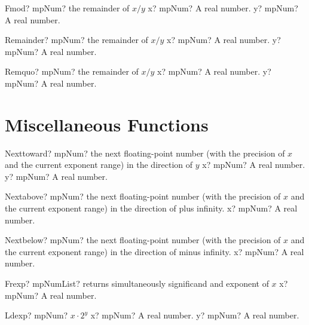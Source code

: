 \documentclass[12pt,a4paper,openany]{book}
\begin{document}
\begin{mpFunctionsExtract}
\mpFunctionTwo
{Fmod? mpNum? the remainder of $x/y$}
{x? mpNum? A real number.}
{y? mpNum? A real number.}
\end{mpFunctionsExtract}

\begin{mpFunctionsExtract}
\mpFunctionTwo
{Remainder? mpNum? the remainder of $x/y$}
{x? mpNum? A real number.}
{y? mpNum? A real number.}
\end{mpFunctionsExtract}

\begin{mpFunctionsExtract}
\mpFunctionTwo
{Remquo? mpNum? the remainder of $x/y$}
{x? mpNum? A real number.}
{y? mpNum? A real number.}
\end{mpFunctionsExtract}

\section{Miscellaneous Functions}

\begin{mpFunctionsExtract}
\mpFunctionTwo
{Nexttoward? mpNum? the next floating-point number (with the precision of $x$ and the current exponent range) in the direction of $y$}
{x? mpNum? A real number.}
{y? mpNum? A real number.}
\end{mpFunctionsExtract}

\begin{mpFunctionsExtract}
\mpFunctionOne
{Nextabove? mpNum? the next floating-point number (with the precision of $x$ and the current exponent range) in the direction of plus infinity.}
{x? mpNum? A real number.}
\end{mpFunctionsExtract}

\begin{mpFunctionsExtract}
\mpFunctionOne
{Nextbelow? mpNum? the next floating-point number (with the precision of $x$ and the current exponent range) in the direction of minus infinity.}
{x? mpNum? A real number.}
\end{mpFunctionsExtract}

\begin{mpFunctionsExtract}
\mpFunctionOne
{Frexp? mpNumList? returns simultaneously significand and exponent of $x$}
{x? mpNum? A real number.}
\end{mpFunctionsExtract}

\begin{mpFunctionsExtract}
\mpFunctionTwo
{Ldexp? mpNum? $x \cdot 2^{y}$}
{x? mpNum? A real number.}
{y? mpNum? A real number.}
\end{mpFunctionsExtract}
\end{document}
